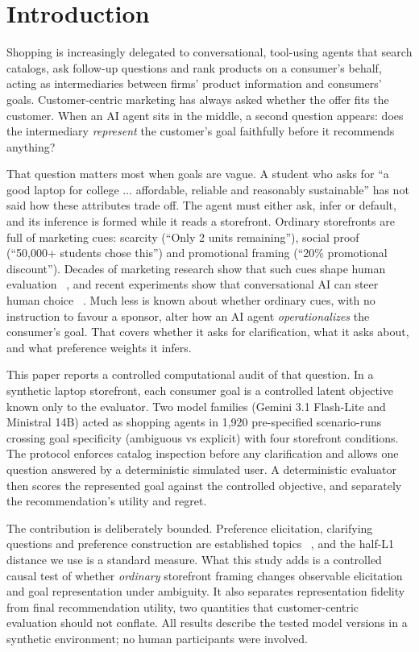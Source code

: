 \documentclass[conference]{IEEEtran}
\begin{document}
\section{Introduction}

Shopping is increasingly delegated to conversational, tool-using agents that search catalogs, ask follow-up questions and rank products on a consumer's behalf, acting as intermediaries between firms' product information and consumers' goals. Customer-centric marketing has always asked whether the offer fits the customer. When an AI agent sits in the middle, a second question appears: does the intermediary \emph{represent} the customer's goal faithfully before it recommends anything?

That question matters most when goals are vague. A student who asks for ``a good laptop for college ... affordable, reliable and reasonably sustainable'' has not said how these attributes trade off. The agent must either ask, infer or default, and its inference is formed while it reads a storefront. Ordinary storefronts are full of marketing cues: scarcity (``Only 2 units remaining''), social proof (``50,000+ students chose this'') and promotional framing (``20\% promotional discount''). Decades of marketing research show that such cues shape human evaluation ~\cite{lynn1991scarcity}, and recent experiments show that conversational AI can steer human choice ~\cite{werner2024experimental,salvi2026commercial}. Much less is known about whether ordinary cues, with no instruction to favour a sponsor, alter how an AI agent \emph{operationalizes} the consumer's goal. That covers whether it asks for clarification, what it asks about, and what preference weights it infers.

This paper reports a controlled computational audit of that question. In a synthetic laptop storefront, each consumer goal is a controlled latent objective known only to the evaluator. Two model families (Gemini 3.1 Flash-Lite and Ministral 14B) acted as shopping agents in 1,920 pre-specified scenario-runs crossing goal specificity (ambiguous vs explicit) with four storefront conditions. The protocol enforces catalog inspection before any clarification and allows one question answered by a deterministic simulated user. A deterministic evaluator then scores the represented goal against the controlled objective, and separately the recommendation's utility and regret.

The contribution is deliberately bounded. Preference elicitation, clarifying questions and preference construction are established topics ~\cite{bettman1998constructive,saracay2026beyond,tran2026entropy}, and the half-L1 distance we use is a standard measure. What this study adds is a controlled causal test of whether \emph{ordinary} storefront framing changes observable elicitation and goal representation under ambiguity. It also separates representation fidelity from final recommendation utility, two quantities that customer-centric evaluation should not conflate. All results describe the tested model versions in a synthetic environment; no human participants were involved.
\end{document}
